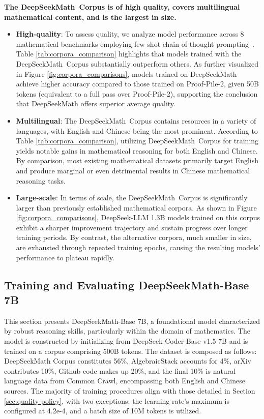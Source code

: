 \begin{itemize}[topsep=0pt]
\textbf{The DeepSeekMath~Corpus is of high quality, covers multilingual mathematical content, and is the largest in size.}

\begin{itemize}[topsep=0pt]
    \item \textbf{High-quality}:
    To assess quality, we analyze model performance across 8 mathematical benchmarks employing few-shot chain-of-thought prompting~\cite{cot}. Table \ref{tab:corpora_comparison} highlights that models trained with the DeepSeekMath~Corpus substantially outperform others. As further visualized in Figure \ref{fig:corpora_comparisons}, models trained on DeepSeekMath achieve higher accuracy compared to those trained on Proof-Pile-2, given 50B tokens (equivalent to a full pass over Proof-Pile-2), supporting the conclusion that DeepSeekMath offers superior average quality.
    \item \textbf{Multilingual}:
    The DeepSeekMath~Corpus contains resources in a variety of languages, with English and Chinese being the most prominent. According to Table \ref{tab:corpora_comparison}, utilizing DeepSeekMath~Corpus for training yields notable gains in mathematical reasoning for both English and Chinese. By comparison, most existing mathematical datasets primarily target English and produce marginal or even detrimental results in Chinese mathematical reasoning tasks.
    \item \textbf{Large-scale}:
    In terms of scale, the DeepSeekMath~Corpus is significantly larger than previously established mathematical corpora. As shown in Figure \ref{fig:corpora_comparisons}, DeepSeek-LLM 1.3B models trained on this corpus exhibit a sharper improvement trajectory and sustain progress over longer training periods. By contrast, the alternative corpora, much smaller in size, are exhausted through repeated training epochs, causing the resulting models’ performance to plateau rapidly.
\end{itemize}

\subsection{Training and Evaluating DeepSeekMath-Base 7B}

This section presents DeepSeekMath-Base 7B, a foundational model characterized by robust reasoning skills, particularly within the domain of mathematics. The model is constructed by initializing from DeepSeek-Coder-Base-v1.5 7B \citep{deepseek-coder} and is trained on a corpus comprising 500B tokens. The dataset is composed as follows: DeepSeekMath Corpus constitutes 56\%, AlgebraicStack accounts for 4\%, arXiv contributes 10\%, Github code makes up 20\%, and the final 10\% is natural language data from Common Crawl, encompassing both English and Chinese sources. The majority of training procedures align with those detailed in Section \ref{sec:quality-policy}, with two exceptions: the learning rate's maximum is configured at 4.2e-4, and a batch size of 10M tokens is utilized.


\end{itemize}
